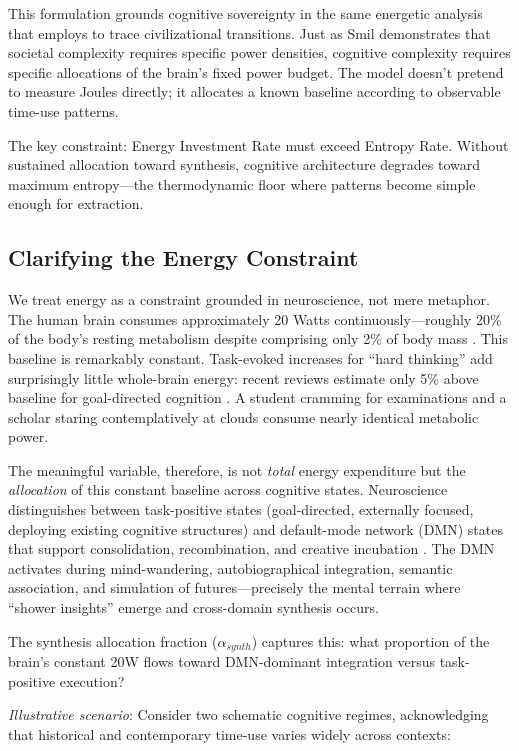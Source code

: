 This formulation grounds cognitive sovereignty in the same energetic analysis that \citet{smil2017} employs to trace civilizational transitions. Just as Smil demonstrates that societal complexity requires specific power densities, cognitive complexity requires specific allocations of the brain's fixed power budget. The model doesn't pretend to measure Joules directly; it allocates a known baseline according to observable time-use patterns.

The key constraint: Energy Investment Rate must exceed Entropy Rate. Without sustained allocation toward synthesis, cognitive architecture degrades toward maximum entropy—the thermodynamic floor where patterns become simple enough for extraction.

\subsection{Clarifying the Energy Constraint}
\label{sec:energy-constraint}

We treat energy as a constraint grounded in neuroscience, not mere metaphor. The human brain consumes approximately 20 Watts continuously—roughly 20\% of the body's resting metabolism despite comprising only 2\% of body mass \citep{raichle2002}. This baseline is remarkably constant. Task-evoked increases for ``hard thinking'' add surprisingly little whole-brain energy: recent reviews estimate only 5\% above baseline for goal-directed cognition \citep{jamadar2025}. A student cramming for examinations and a scholar staring contemplatively at clouds consume nearly identical metabolic power.

The meaningful variable, therefore, is not \textit{total} energy expenditure but the \textit{allocation} of this constant baseline across cognitive states. Neuroscience distinguishes between task-positive states (goal-directed, externally focused, deploying existing cognitive structures) and default-mode network (DMN) states that support consolidation, recombination, and creative incubation \citep{raichle2001}. The DMN activates during mind-wandering, autobiographical integration, semantic association, and simulation of futures—precisely the mental terrain where ``shower insights'' emerge and cross-domain synthesis occurs.

The synthesis allocation fraction ($\alpha_{synth}$) captures this: what proportion of the brain's constant 20W flows toward DMN-dominant integration versus task-positive execution?

\textit{Illustrative scenario}: Consider two schematic cognitive regimes, acknowledging that historical and contemporary time-use varies widely across contexts:

